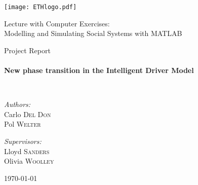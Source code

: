 \begin{titlepage} \begin{center}
        
    \begin{flushright}
        \texttt{[image: ETHlogo.pdf]}~\\[1cm]
    \end{flushright}
        
        
    \vspace{4cm}
    \LARGE{ 	Lecture with Computer Exercises:\\ }
    \LARGE{ Modelling and Simulating Social Systems with MATLAB\\}
    
    \bigskip\bigskip
    
    \small{Project Report}\\
    
            
    \HRule \\[0.4cm] { \huge \bfseries New phase transition in the Intelligent Driver Model\\[0.4cm] }
    
    \HRule \\[1.5cm]
    
    \noindent 
    \begin{minipage}[t]{0.4\textwidth} 
        \begin{flushleft} 
            \large \emph{Authors:}\\ Carlo \textsc{Del Don}\\ Pol \textsc{Welter} 
        \end{flushleft} 
    \end{minipage}
    \begin{minipage}[t]{0.4\textwidth}
        \begin{flushright}
            \large \emph{Supervisors:} \\
            Lloyd \textsc{Sanders} \\
            Olivia \textsc{Woolley} \\
        \end{flushright}
    \end{minipage}
    
    \vfill
    
    {\large \today}
        
\end{center} \end{titlepage}